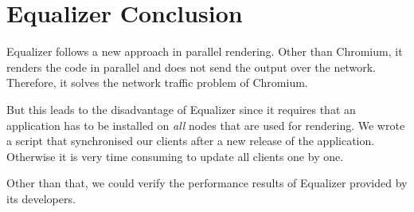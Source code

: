 \section{Equalizer Conclusion}

Equalizer follows a new approach in parallel rendering. Other than Chromium, it renders the code in parallel and does not send the output over the network. Therefore, it solves the network traffic problem of Chromium.

But this leads to the disadvantage of Equalizer since it requires that an application has to be installed on \emph{all} nodes that are used for rendering. We wrote a script that synchronised our clients after a new release of the application. Otherwise it is very time consuming to update all clients one by one.

Other than that, we could verify the performance results of Equalizer provided by its developers.
